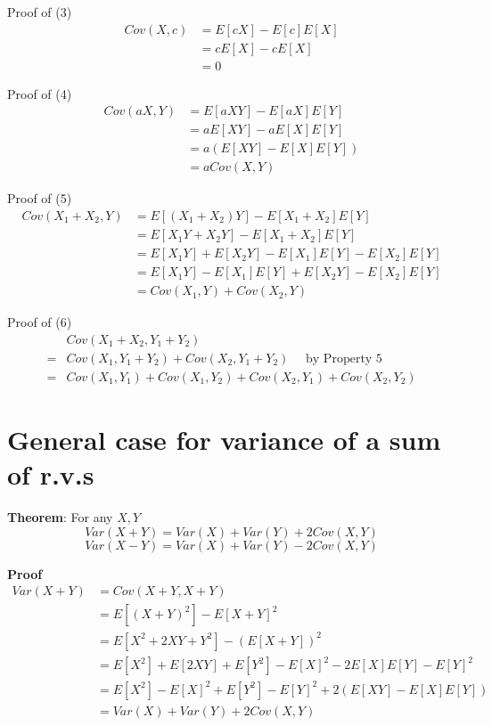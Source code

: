 Proof of (3) 
\begin{align*}
   Cov(X, c) &= E[cX] - E[c]E[X] \\
             &= cE[X] - cE[X] \\
             &= 0
\end{align*}

Proof of (4)
\begin{align*}
   Cov(aX, Y) &= E[aXY] - E[aX]E[Y] \\
              &= aE[XY] - aE[X]E[Y] \\
              &= a \left( E[XY] - E[X] E[Y] \right)  \\
              &= a Cov(X, Y)
\end{align*}

Proof of (5)
\begin{align*}
   Cov(X_1 + X_2, Y) &= E[(X_1 + X_2)Y] - E[X_1 + X_2]E[Y] \\
              &= E[X_1 Y + X_2 Y]  - E[X_1 + X_2]E[Y] \\
              &= E[X_1 Y] + E[X_2 Y] - E[X_1 ] E[Y] - E[X_2] E[Y] \\
              &= E[X_1 Y] - E[X_1 ] E[Y] + E[X_2 Y]- E[X_2] E[Y] \\
              &= Cov(X_1, Y) + Cov(X_2, Y)
\end{align*}

Proof of (6) 
\begin{align*}
   &Cov(X_1 + X_2, Y_1 + Y_2)  \\
   =& Cov(X_1, Y_1 + Y_2) + Cov(X_2, Y_1 + Y_2) \quad  \text{ by Property 5} \\
   =& Cov(X_1, Y_1) + Cov(X_1, Y_2) +  Cov(X_2, Y_1) + Cov(X_2, Y_2) 
\end{align*}

\section{General case for variance of a sum of r.v.s}

\begin{framed}
   \textbf{Theorem}: For any $X, Y$
    \[
     Var(X + Y) = Var(X) + Var(Y) + 2 Cov(X, Y)
   \] 
   \[
     Var(X - Y) = Var(X) + Var(Y) - 2 Cov(X, Y)
   \] 
\end{framed}

\textbf{Proof}
\begin{align*}
   Var(X + Y) &= Cov(X+Y, X+Y) \\
              &= E\left[ (X + Y)^2\right] - E[X+Y]^2 \\
              &= E\left[ X^2 + 2XY + Y^2 \right] - \left( E[X + Y] \right)^2 \\
              &= E[X^2] + E[2XY] + E[Y^2] - E[X]^2 - 2E[X]E[Y] - E[Y]^2 \\
              &= E[X^2] - E[X]^2 + E[Y^2] - E[Y]^2 + 2 \left( E[XY] - E[X]E[Y] \right)  \\
              &= Var(X) + Var(Y) + 2Cov(X, Y)
\end{align*}

